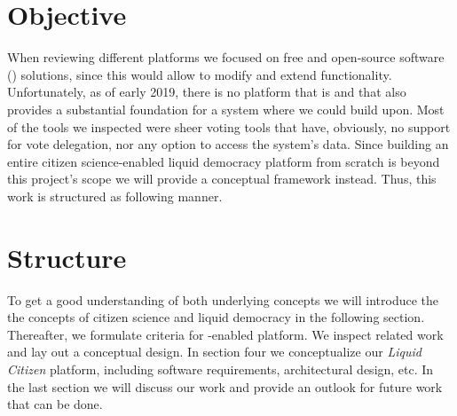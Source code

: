 \section{Objective}
\label{sec:Objective}

When reviewing different platforms we focused on free and open-source software () solutions, since this would allow to modify and extend functionality. Unfortunately, as of early 2019, there is no platform that is  and that also provides a substantial foundation for a  system where we could build upon. Most of the tools we inspected were sheer voting tools that have, obviously, no support for vote delegation, nor any option to access the system’s data. Since building an entire citizen science-enabled liquid democracy platform from scratch is beyond this project’s scope we will provide a conceptual framework instead. Thus, this work is structured as following manner.  






\section{Structure}
\label{sec:structure}

To get a good understanding of both underlying concepts we will introduce the the concepts of citizen science and liquid democracy in the following section. Thereafter, we formulate criteria for -enabled  platform. We inspect related work and lay out a conceptual design. In section four we conceptualize our \textit{Liquid Citizen} platform, including software requirements, architectural design, etc. In the last section we will discuss our work and provide an outlook for future work that can be done. 
